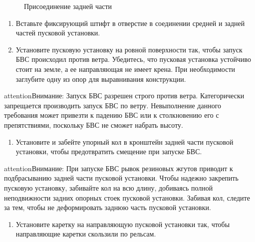 \documentclass[a4paper,10pt,russian,openany]{sphinxmanual}
\let\sphinxpxdimen\pdfpxdimen\else\newdimen\sphinxpxdimen
\begin{document}
\begin{figure}[H]
\centering
\capstart

\noindent\sphinxincludegraphics[width=320\sphinxpxdimen]{{catapult3}.png}
\caption{Присоединение задней части}\label{\detokenize{catapult:id7}}\end{figure}
\begin{enumerate}
\def\theenumi{\arabic{enumi}}
\def\labelenumi{\theenumi )}
\makeatletter\def\p@enumii{\p@enumi \theenumi )}\makeatother
\setcounter{enumi}{4}
\item {} 
Вставьте фиксирующий штифт в отверстие в соединении средней и задней частей пусковой установки.

\item {} 
Установите пусковую установку на ровной поверхности так, чтобы запуск БВС происходил против ветра. Убедитесь, что пусковая установка устойчиво стоит на земле, а ее направляющая не имеет крена. При необходимости заглубите одну из опор для выравнивания конструкции.

\end{enumerate}

\begin{sphinxadmonition}{attention}{Внимание:}
Запуск БВС разрешен строго против ветра. Категорически запрещается производить запуск БВС по ветру. Невыполнение данного требования может привезти к падению БВС или к столкновению его с препятствиями, поскольку БВС не сможет набрать высоту.
\end{sphinxadmonition}
\begin{enumerate}
\def\theenumi{\arabic{enumi}}
\def\labelenumi{\theenumi )}
\makeatletter\def\p@enumii{\p@enumi \theenumi )}\makeatother
\setcounter{enumi}{6}
\item {} 
Установите и забейте упорный кол в кронштейн задней части пусковой установки, чтобы предотвратить смещение при запуске БВС.

\end{enumerate}

\begin{sphinxadmonition}{attention}{Внимание:}
При запуске БВС рывок резиновых жгутов приводит к подбрасыванию задней части пусковой установки. Чтобы надежно закрепить пусковую установку, забивайте кол на всю длину, добиваясь полной неподвижности задних опорных стоек пусковой установки. Забивая кол, следите за тем, чтобы не деформировать заднюю часть пусковой установки.
\end{sphinxadmonition}
\begin{enumerate}
\def\theenumi{\arabic{enumi}}
\def\labelenumi{\theenumi )}
\makeatletter\def\p@enumii{\p@enumi \theenumi )}\makeatother
\setcounter{enumi}{7}
\item {} 
Установите каретку на направляющую пусковой установки так, чтобы направляющие каретки скользили по рельсам.

\end{enumerate}
\end{document}
